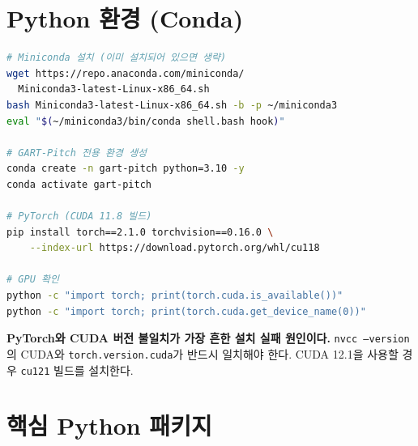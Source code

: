 \documentclass[11pt, a4paper]{report}
\begin{document}
\section{Python 환경 (Conda)}

\begin{termbox}[title={Conda 환경 생성}]
\begin{lstlisting}[language=bash, numbers=none]
# Miniconda 설치 (이미 설치되어 있으면 생략)
wget https://repo.anaconda.com/miniconda/
  Miniconda3-latest-Linux-x86_64.sh
bash Miniconda3-latest-Linux-x86_64.sh -b -p ~/miniconda3
eval "$(~/miniconda3/bin/conda shell.bash hook)"

# GART-Pitch 전용 환경 생성
conda create -n gart-pitch python=3.10 -y
conda activate gart-pitch

# PyTorch (CUDA 11.8 빌드)
pip install torch==2.1.0 torchvision==0.16.0 \
    --index-url https://download.pytorch.org/whl/cu118

# GPU 확인
python -c "import torch; print(torch.cuda.is_available())"
python -c "import torch; print(torch.cuda.get_device_name(0))"
\end{lstlisting}
\end{termbox}

\begin{warningbox}
\textbf{PyTorch와 CUDA 버전 불일치가 가장 흔한 설치 실패 원인이다.}
\texttt{nvcc --version}의 CUDA와 \texttt{torch.version.cuda}가 반드시 일치해야 한다.
CUDA 12.1을 사용할 경우 \texttt{cu121} 빌드를 설치한다.
\end{warningbox}


\section{핵심 Python 패키지}
\end{document}

